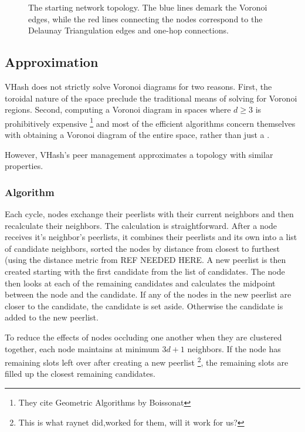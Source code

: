 \documentclass{IEEEtran}
\begin{document}
\begin{figure}
    \caption{The starting network topology.  The blue lines demark the Voronoi edges, while the red lines connecting the nodes correspond to the Delaunay Triangulation edges and one-hop connections.}
    \label{churninit}
\end{figure}

\subsection{Approximation}

VHash does not strictly solve Voronoi diagrams \cite{voronoi} for two reasons.  First, the toroidal nature of the space preclude the traditional means of solving for Voronoi regions. Second, computing a Voronoi diagram in spaces where $d \geq 3$ is prohibitively expensive \cite{raynet}\footnote{They cite Geometric Algorithms by Boissonat} and most of the efficient algorithms concern themselves with obtaining a Voronoi diagram of the entire space, rather than just a .


However, VHash's peer management approximates a topology with similar properties. 
\subsubsection{Algorithm}
Each cycle, nodes exchange their peerlists with their current neighbors and then recalculate their neighbors.  
The calculation is straightforward.  After a node receives it's neighbor's peerlists, it combines their peerlists and its own into a list of candidate neighbors, sorted the nodes by distance from closest to furthest (using the distance metric from REF NEEDED HERE.  A new peerlist is then created starting with the first candidate from the list of candidates.  The node then looks at each of the remaining candidates and calculates the midpoint between the node and the candidate.  If any of the nodes in the new peerlist are closer to the candidate, the candidate is set aside.  Otherwise the candidate is added to the new peerlist.

To reduce the effects of nodes occluding one another when they are clustered together, each node maintains at minimum $3d+1$ neighbors.  If the node has remaining slots left over after creating a new peerlist \footnote{This is what raynet did,worked for them, will it work for us?}, the remaining slots are filled up the closest remaining candidates.
\end{document}
